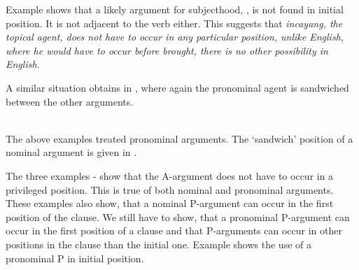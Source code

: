
Example  shows that a likely argument for subjecthood, , is not found in initial position. It is not adjacent to the verb either. This suggests that \em incayang\em, the topical agent, does not have to occur in any particular position, unlike English, where \em he \em would have to occur before \em brought\em, there is no other possibility in English.

A similar situation obtains in , where again the pronominal agent is sandwiched between the other arguments.

 \\

The above examples treated pronominal arguments. The `sandwich' position of a nominal argument is given in .



The three examples - show that the A-argument does not have to occur in a privileged position. This is true of both nominal and pronominal arguments. These examples also show, that a nominal P-argument can occur in the first position of the clause. We still have to show, that a pronominal P-argument can occur in the first position of a clause  and that P-arguments can occur in other positions in the clause than the initial one.
Example  shows the use of a pronominal P in initial position.

